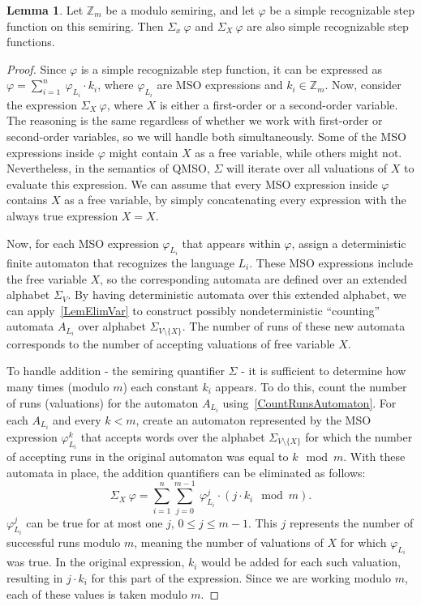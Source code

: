 \documentclass[12pt]{article}
\theoremstyle{definition}
\newtheorem{lemma}[theorem]{Lemma}
\begin{document}
\begin{lemma}
    \label{QuantElimAdd}
    Let $\mathbb{Z}_m$ be a modulo semiring, and let $\varphi$ be a simple recognizable step function on this semiring. Then $\Sigma_x \ \varphi$ and $\Sigma_X \ \varphi$ are also simple recognizable step functions.
\end{lemma}

\begin{proof}
    Since $\varphi$ is a simple recognizable step function, it can be expressed as $\varphi = \sum_{i = 1}^{n} \ \varphi_{L_i} \cdot k_i$, where $\varphi_{L_i}$ are MSO expressions and $k_i \in \mathbb{Z}_m$. Now, consider the expression $\Sigma_{X} \ \varphi$, where $X$ is either a first-order or a second-order variable. The reasoning is the same regardless of whether we work with first-order or second-order variables, so we will handle both simultaneously. Some of the MSO expressions inside $\varphi$ might contain $X$ as a free variable, while others might not. Nevertheless, in the semantics of QMSO, $\Sigma$ will iterate over all valuations of $X$ to evaluate this expression. We can assume that every MSO expression inside $\varphi$ contains $X$ as a free variable, by simply concatenating every expression with the always true expression $X = X$.

    Now, for each MSO expression $\varphi_{L_i}$ that appears within $\varphi$, assign a deterministic finite automaton that recognizes the language $L_i$. These MSO expressions include the free variable $X$, so the corresponding automata are defined over an extended alphabet $\Sigma_V$. By having deterministic automata over this extended alphabet, we can apply~\cref{LemElimVar} to construct possibly nondeterministic ``counting'' automata $A_{L_i}$ over alphabet $\Sigma_{V \setminus \{X\}}$. The number of runs of these new automata corresponds to the number of accepting valuations of free variable $X$.

    To handle addition - the semiring quantifier $\Sigma$ - it is sufficient to determine how many times (modulo $m$) each constant $k_i$ appears. To do this, count the number of runs (valuations) for the automaton $A_{L_i}$ using~\cref{CountRunsAutomaton}. For each $A_{L_i}$ and every $k < m$, create an automaton represented by the MSO expression $\varphi_{L_i}^k$ that accepts words over the alphabet $\Sigma_{V \setminus \{X\}}$ for which the number of accepting runs in the original automaton was equal to $k \mod m$. With these automata in place, the addition quantifiers can be eliminated as follows:
    $$\Sigma_X \ \varphi = \sum_{i = 1}^n \sum_{j = 0}^{m-1} \ \varphi_{L_i}^j \cdot (j \cdot k_i \mod m).$$
    $\varphi_{L_i}^j$ can be true for at most one $j$, $0 \leq j \leq m-1$. This $j$ represents the number of successful runs modulo $m$, meaning the number of valuations of $X$ for which $\varphi_{L_i}$ was true. In the original expression, $k_i$ would be added for each such valuation, resulting in $j \cdot k_i$ for this part of the expression. Since we are working modulo $m$, each of these values is taken modulo $m$.
\end{proof}
\end{document}
